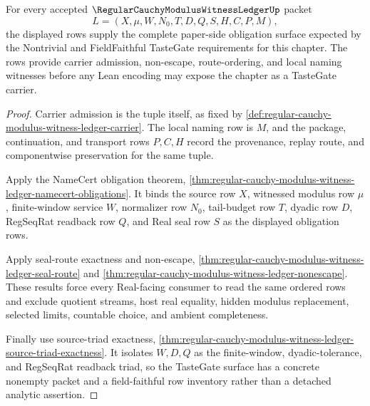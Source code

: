 \begin{theorem}
\label{thm:regular-cauchy-modulus-witness-ledger-tastegate-readiness}
For every accepted $\RegularCauchyModulusWitnessLedgerUp$ packet
$$
L=(X,\mu,W,N_0,T,D,Q,S,H,C,P,M),
$$
the displayed rows supply the complete paper-side obligation surface expected by the Nontrivial and FieldFaithful TasteGate requirements for this chapter. The rows provide carrier admission, non-escape, route-ordering, and local naming witnesses before any Lean encoding may expose the chapter as a TasteGate carrier.
\end{theorem}
\begin{proof}
Carrier admission is the tuple itself, as fixed by \autoref{def:regular-cauchy-modulus-witness-ledger-carrier}. The local naming row is $M$, and the package, continuation, and transport rows $P,C,H$ record the provenance, replay route, and componentwise preservation for the same tuple.

Apply the NameCert obligation theorem, \autoref{thm:regular-cauchy-modulus-witness-ledger-namecert-obligations}. It binds the source row $X$, witnessed modulus row $\mu$, finite-window service $W$, normalizer row $N_0$, tail-budget row $T$, dyadic row $D$, RegSeqRat readback row $Q$, and Real seal row $S$ as the displayed obligation rows.

Apply seal-route exactness and non-escape, \autoref{thm:regular-cauchy-modulus-witness-ledger-seal-route} and \autoref{thm:regular-cauchy-modulus-witness-ledger-nonescape}. These results force every Real-facing consumer to read the same ordered rows and exclude quotient streams, host real equality, hidden modulus replacement, selected limits, countable choice, and ambient completeness.

Finally use source-triad exactness, \autoref{thm:regular-cauchy-modulus-witness-ledger-source-triad-exactness}. It isolates $W,D,Q$ as the finite-window, dyadic-tolerance, and RegSeqRat readback triad, so the TasteGate surface has a concrete nonempty packet and a field-faithful row inventory rather than a detached analytic assertion.
\end{proof}

